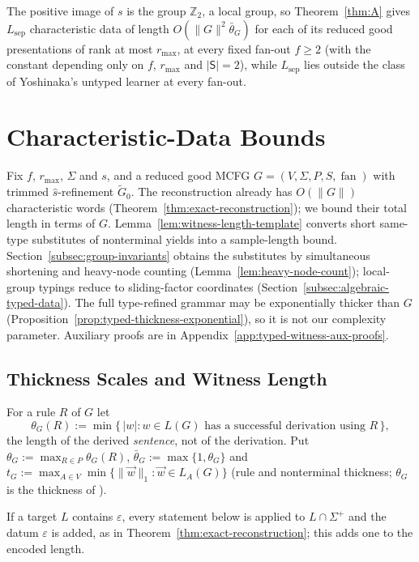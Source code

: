 \documentclass[11pt]{article}
\numberwithin{equation}{section}
\theoremstyle{plain}
\theoremstyle{definition}
\theoremstyle{remark}
\newcommand{\tuple}[1]{\vec{#1}}
\newcommand{\eps}{\varepsilon}
\newcommand{\fan}{\operatorname{fan}}
\theoremstyle{plain}
\begin{document}
The positive image of $s$ is the group $\mathbb Z_2$, a local group, so
Theorem~\ref{thm:A} gives $L_{\mathrm{sep}}$ characteristic data of length
$O(\|G\|^2\bar\theta_G)$ for each of its reduced good presentations
of rank at most $r_{\max}$, at every fixed fan-out $f\ge2$ (with the
constant depending only on $f$, $r_{\max}$ and $|\mathsf S|=2$),
while $L_{\mathrm{sep}}$ lies outside the class of Yoshinaka's untyped learner
\cite{Yoshinaka2011} at every fan-out.

\section{Characteristic-Data Bounds}
\label{sec:char-data}
Fix $f$, $r_{\max}$, $\Sigma$ and $s$, and a reduced good MCFG
$G=(V,\Sigma,P,S,\fan)$ with trimmed $\widehat s$-refinement
$\widetilde G_0$.  The reconstruction already has $O(\|G\|)$
characteristic words (Theorem~\ref{thm:exact-reconstruction});
we bound their total length in terms of $G$.
Lemma~\ref{lem:witness-length-template} converts short
same-type substitutes of nonterminal yields into a sample-length
bound.  Section~\ref{subsec:group-invariants} obtains the substitutes
by simultaneous shortening and heavy-node counting
(Lemma~\ref{lem:heavy-node-count}); local-group typings reduce to
sliding-factor coordinates (Section~\ref{subsec:algebraic-typed-data}).
The full type-refined grammar may be exponentially thicker than $G$
(Proposition~\ref{prop:typed-thickness-exponential}), so it is not
our complexity parameter.  Auxiliary proofs are in
Appendix~\ref{app:typed-witness-aux-proofs}.

\subsection{Thickness Scales and Witness Length}
\label{subsec:thickness-contexts}

For a rule $R$ of $G$ let
\[
 \theta_G(R):=\min\{\,|w|:w\in L(G)\text{ has a successful derivation using }R\,\},
\]
the length of the derived \emph{sentence}, not of the derivation.  Put
$\theta_G:=\max_{R\in P}\theta_G(R)$, $\bar\theta_G:=\max\{1,\theta_G\}$ and
$t_G:=\max_{A\in V}\min\{\|\tuple w\|_1:\tuple w\in L_A(G)\}$ (rule and
nonterminal thickness; $\theta_G$ is the thickness of
\cite[Section~4.3]{Yoshinaka2011}).

If a target $L$ contains $\eps$, every statement below is applied to
$L\cap\Sigma^+$ and the datum $\eps$ is added, as in
Theorem~\ref{thm:exact-reconstruction}; this adds one to the encoded length.
\end{document}
